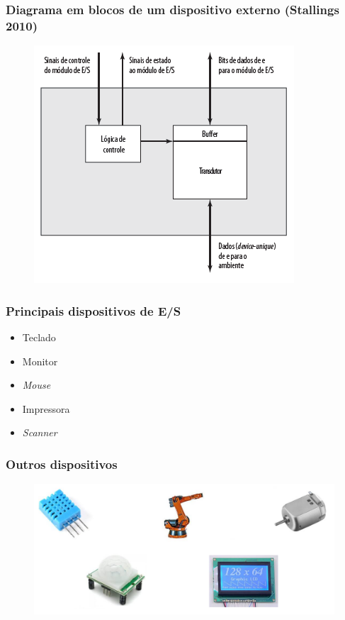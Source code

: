 \documentclass[aspectratio=169,
				xcolor=table]{beamer}
\begin{document}
	\begin{frame}
		\frametitle{Diagrama em blocos de um dispositivo externo (Stallings 2010)}
		\begin{figure}[hbtp]
		\centering
		\includegraphics[height=.75\textheight, keepaspectratio]{../figs/cap10/diagrama01.png}
		\end{figure}		
	\end{frame}
	
	\begin{frame}
		\frametitle{Principais dispositivos de E/S}
		\begin{itemize}
		 	\item Teclado
		 	\vspace{1em}
		 	\item Monitor
		 	\vspace{1em}
		 	\item \textit{Mouse}
		 	\vspace{1em}
		 	\item Impressora
		 	\vspace{1em}		 	
		 	\item \textit{Scanner}
		 	
		\end{itemize}
	\end{frame}
	
	\begin{frame}
		\frametitle{Outros dispositivos}
		\begin{figure}[hbtp]
		\centering
		\includegraphics[height=.75\textheight, keepaspectratio]{../figs/cap10/dispositivos2.png}
		\end{figure}		
	\end{frame}
\end{document}
